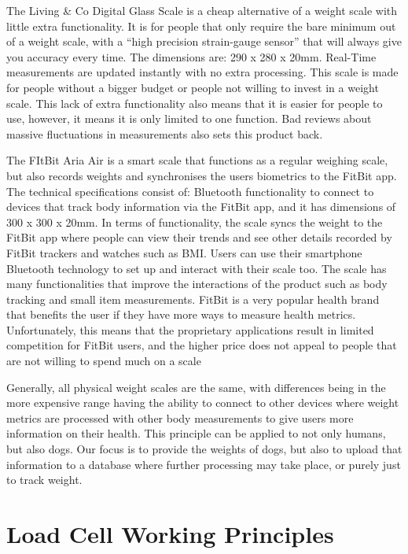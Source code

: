 The Living \& Co Digital Glass Scale is a cheap alternative of a weight scale with little extra functionality. It is for people that only require the bare minimum out of a weight scale, with a “high precision strain-gauge sensor” that will always give you accuracy every time. The dimensions are: 290 x 280 x 20mm. Real-Time measurements are updated instantly with no extra processing. This scale is made for people without a bigger budget or people not willing to invest in a weight scale. This lack of extra functionality also means that it is easier for people to use, however, it means it is only limited to one function. Bad reviews about massive fluctuations in measurements also sets this product back.

The FItBit Aria Air is a smart scale that functions as a regular weighing scale, but also records weights and synchronises the users biometrics to the FitBit app. The technical specifications consist of: Bluetooth functionality to connect to devices that track body information via the FitBit app, and it has dimensions of 300 x 300 x 20mm. In terms of functionality, the scale syncs the weight to the FitBit app where people can view their trends and see other details recorded by FitBit trackers and watches such as BMI. Users can use their smartphone Bluetooth technology to set up and interact with their scale too. The scale has many functionalities that improve the interactions of the product such as body tracking and small item measurements. FitBit is a very popular health brand that benefits the user if they have more ways to measure health metrics. Unfortunately, this means that the proprietary applications result in limited competition for FitBit users, and the higher price does not appeal to people that are not willing to spend much on a scale

Generally, all physical weight scales are the same, with differences being in the more expensive range having the ability to connect to other devices where weight metrics are processed with other body measurements to give users more information on their health. This principle can be applied to not only humans, but also dogs. Our focus is to provide the weights of dogs, but also to upload that information to a database where further processing may take place, or purely just to track weight.

\section{Load Cell Working Principles}


